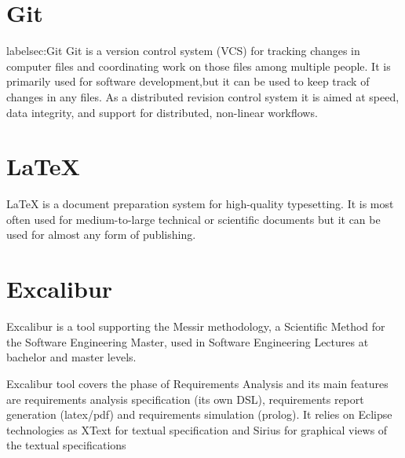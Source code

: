 \section{Git}
label{sec:Git}
Git is a version control system (VCS) for tracking changes in
computer files and coordinating work on those files among multiple people. 
It is primarily used for software development,but it can be used to keep 
track of changes in any files. As a distributed revision control system it 
is aimed at speed, data integrity, and support for distributed, non-linear workflows.

\section{LaTeX}
\label{sec:latex}
LaTeX is a document preparation system for high-quality typesetting. 
It is most often used for medium-to-large technical or scientific documents but it
 can be used for almost any form of publishing.
\section{Excalibur}
\label{sec:excalibur}

Excalibur is a tool supporting the Messir methodology, a Scientific Method for the Software 
Engineering Master, used in Software Engineering Lectures at bachelor and master levels.

Excalibur tool covers the phase of Requirements Analysis and its main features are 
requirements analysis specification (its own DSL), requirements report generation 
(latex/pdf) and requirements simulation (prolog). It relies on Eclipse technologies 
as XText for textual specification and Sirius for graphical views of the textual specifications

% 


